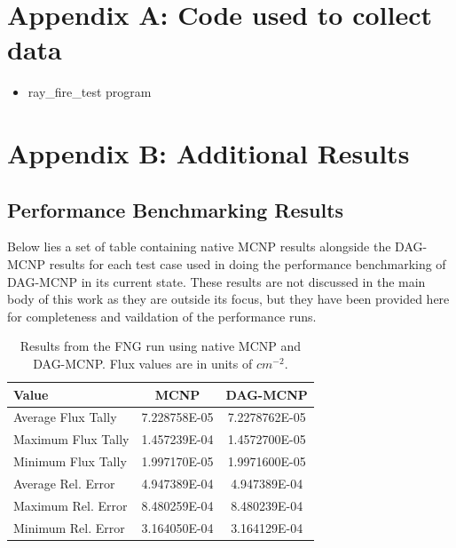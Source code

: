 \documentclass[12pt, a4paper]{article}
\begin{document}





\section{Appendix A: Code used to collect data}%
\begin{itemize}
\item ray\_fire\_test program
\end{itemize}

\section{Appendix B: Additional Results}%

\subsection{Performance Benchmarking Results}%

Below lies a set of table containing native MCNP results alongside the DAG-MCNP results for each test case used in doing the performance benchmarking of DAG-MCNP in its current state. These results are not discussed in the main body of this work as they are outside its focus, but they have been provided here for completeness and vaildation of the performance runs.

\begin{table}[H]
  \caption{Results from the FNG run using native MCNP and DAG-MCNP. Flux values are in units of  $cm^{-2}$.}
  \label{fng_perf_results}
  \centering
  \begin{tabular}{l c c}
    \toprule
    Value & MCNP & DAG-MCNP \\
    \hline
    Average Flux Tally & 7.228758E-05 & 7.2278762E-05 \\
    \hline
    Maximum Flux Tally & 1.457239E-04 & 1.4572700E-05 \\
    \hline
    Minimum Flux Tally & 1.997170E-05 & 1.9971600E-05 \\
    \hline
    Average Rel. Error & 4.947389E-04 & 4.947389E-04 \\
    \hline
    Maximum Rel. Error & 8.480259E-04 & 8.480239E-04 \\
    \hline
    Minimum Rel. Error & 3.164050E-04 & 3.164129E-04 \\
    \bottomrule
  \end{tabular}  
\end{table}
\end{document}
